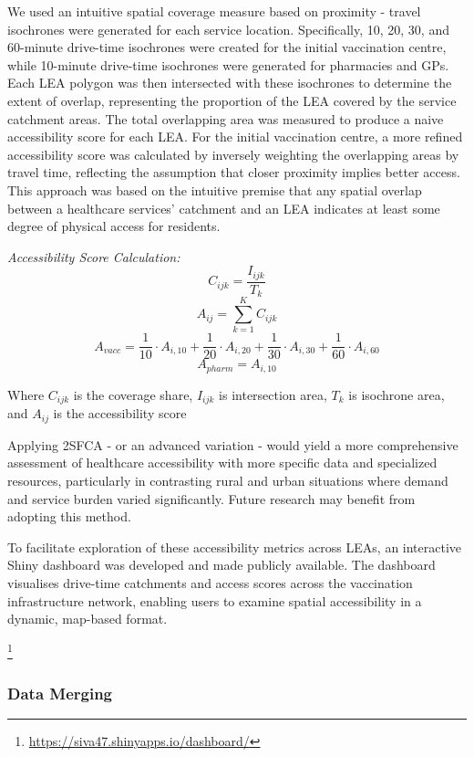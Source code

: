 \documentclass{article}
\begin{document}
We used an intuitive spatial coverage measure based on proximity -
travel isochrones were generated for each service location.
Specifically, 10, 20, 30, and 60-minute drive-time isochrones were
created for the initial vaccination centre, while 10-minute drive-time
isochrones were generated for pharmacies and GPs. Each LEA polygon was
then intersected with these isochrones to determine the extent of
overlap, representing the proportion of the LEA covered by the service
catchment areas. The total overlapping area was measured to produce a
naive accessibility score for each LEA. For the initial vaccination
centre, a more refined accessibility score was calculated by inversely
weighting the overlapping areas by travel time, reflecting the
assumption that closer proximity implies better access. This approach
was based on the intuitive premise that any spatial overlap between a
healthcare services' catchment and an LEA indicates at least some degree
of physical access for residents.

\emph{Accessibility Score Calculation:}
\[C_{ijk} = \frac{I_{ijk}}{T_k}\] \[A_{ij} = \sum_{k=1}^{K} C_{ijk}\]
\[A_{vacc} = \frac{1}{10} \cdot A_{i,10} + \frac{1}{20} \cdot A_{i,20} + \frac{1}{30} \cdot A_{i,30} + \frac{1}{60} \cdot A_{i,60}\]
\[A_{pharm} = A_{i,10}\]

Where \(C_{ijk}\) is the coverage share, \(I_{ijk}\) is intersection
area, \(T_k\) is isochrone area, and \(A_{ij}\) is the accessibility
score

Applying 2SFCA - or an advanced variation - would yield a more
comprehensive assessment of healthcare accessibility with more specific
data and specialized resources, particularly in contrasting rural and
urban situations where demand and service burden varied significantly.
Future research may benefit from adopting this method.

To facilitate exploration of these accessibility metrics across LEAs, an
interactive Shiny dashboard was developed and made publicly available.
The dashboard visualises drive-time catchments and access scores across
the vaccination infrastructure network, enabling users to examine
spatial accessibility in a dynamic, map-based format.

\footnote{\url{https://siva47.shinyapps.io/dashboard/}}

\subsubsection{Data Merging}\label{data-merging}
\end{document}
